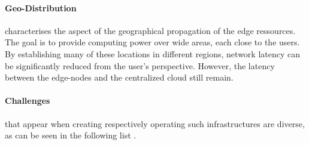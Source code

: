 \documentclass[MSC,Master,english]{twbook}%
\begin{document}
\paragraph{Geo-Distribution} characterises the aspect of the geographical propagation of the edge ressources. The goal is to provide computing power over wide areas, each close to the users. By establishing many of these locations in different regions, network latency can be significantly reduced from the user's perspective. However, the latency between the edge-nodes and the centralized cloud still remain.

\paragraph{Challenges} that appear when creating respectively operating such infrastructures are diverse, as can be seen in the following list \cite{intro-edge}.
\end{document}
